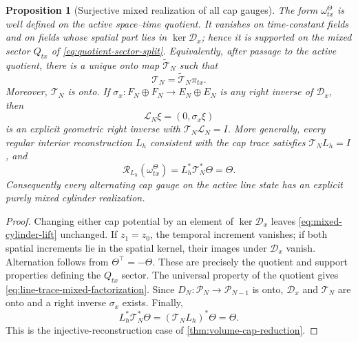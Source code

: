 \documentclass[11pt,a4paper]{article}
\newtheorem{proposition}[theorem]{Proposition}
\begin{document}
\begin{proposition}[Surjective mixed realization of all cap gauges]
\label{prop:mixed-cylinder-lift}
The form \(\omega_{tx}^{\Theta}\) is well defined on the active
space--time quotient.  It vanishes on time-constant fields and on fields
whose spatial part lies in \(\ker\mathcal D_x\); hence it is supported on
the mixed sector \(Q_{tx}\) of \cref{eq:quotient-sector-split}.
Equivalently, after passage to the active quotient, there is a unique onto
map \(\widetilde{\mathcal T}_N\) such that
\begin{equation}\label{eq:line-trace-mixed-factorization}
 \boxed{\quad
 \mathcal T_N=\widetilde{\mathcal T}_N\pi_{tx}.
 \quad}
\end{equation}
Moreover, \(\mathcal T_N\) is onto.  If
\(\sigma_x:F_N\oplus F_N\to E_N\oplus E_N\) is any right inverse of
\(\mathcal D_x\), then
\begin{equation}\label{eq:line-geometric-lifting}
 \mathcal L_N\xi=(0,\sigma_x\xi)
\end{equation}
is an explicit geometric right inverse with
\(\mathcal T_N\mathcal L_N=I\).  More generally, every regular interior
reconstruction \(L_h\) consistent with the cap trace satisfies
\(\mathcal T_NL_h=I\), and
\begin{equation}\label{eq:mixed-cap-reduction}
 \boxed{\quad
 \mathcal R_{L_h}(\omega_{tx}^{\Theta})
 =L_h^*\mathcal T_N^*\Theta=\Theta.
 \quad}
\end{equation}
Consequently every alternating cap gauge on the active line state has an
explicit purely mixed cylinder realization.
\end{proposition}

\begin{proof}
Changing either cap potential by an element of
\(\ker\mathcal D_x\) leaves \cref{eq:mixed-cylinder-lift} unchanged.
If \(z_1=z_0\), the temporal increment vanishes; if both spatial
increments lie in the spatial kernel, their images under
\(\mathcal D_x\) vanish.  Alternation follows from
\(\Theta^\top=-\Theta\).  These are precisely the quotient and support
properties defining the \(Q_{tx}\) sector.  The universal property of the
quotient gives \cref{eq:line-trace-mixed-factorization}.  Since
\(D_N:\mathcal P_N\to\mathcal P_{N-1}\) is onto,
\(\mathcal D_x\) and \(\mathcal T_N\) are onto and a right inverse
\(\sigma_x\) exists.  Finally,
\[
 L_h^*\mathcal T_N^*\Theta
 =(\mathcal T_NL_h)^*\Theta=\Theta.
\]
This is the injective-reconstruction case of
\cref{thm:volume-cap-reduction}.
\end{proof}
\end{document}
